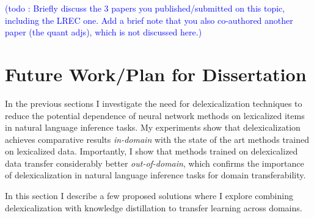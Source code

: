\documentclass{article}
\newcommand\todo[1]{\textcolor{blue}{(todo : #1)}}
\begin{document}
\todo{Briefly discuss the 3 papers you published/submitted on this topic, including the LREC one. Add a brief note that you also co-authored another paper (the quant adjs), which is not discussed here.}


 
\section{Future Work/Plan for Dissertation}
In the previous sections I investigate the need for delexicalization techniques to reduce the potential dependence of neural network methods on lexicalized items in natural language inference tasks. My experiments show that delexicalization achieves comparative results {\em in-domain} with the state of the art methods trained on lexicalized data. Importantly, I show that methods trained on delexicalized data transfer considerably better {\em out-of-domain}, which  confirms the importance of delexicalization in natural language inference tasks for domain transferability.

In this section I describe a few proposed solutions where I explore combining delexicalization with knowledge distillation to transfer learning across domains.
\end{document}
